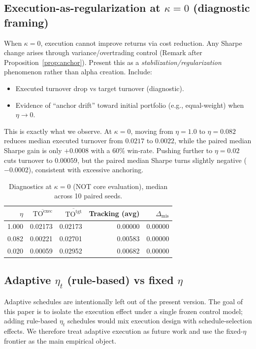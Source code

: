 \documentclass[10pt,twocolumn]{article}
\newcommand{\TOexec}{\mathrm{TO}^{\mathrm{exec}}}
\newcommand{\TOtgt}{\mathrm{TO}^{\mathrm{tgt}}}
\newcommand{\kappaTC}{\kappa}
\begin{document}
\subsection{Execution-as-regularization at $\kappaTC=0$ (diagnostic framing)}
When $\kappaTC=0$, execution cannot improve returns via cost reduction. Any Sharpe change arises through variance/overtrading control (Remark after Proposition~\ref{prop:anchor}). Present this as a \emph{stabilization/regularization} phenomenon rather than alpha creation. Include:
\begin{itemize}[leftmargin=*,itemsep=1pt]
\item Executed turnover drop vs target turnover (diagnostic).
\item Evidence of ``anchor drift'' toward initial portfolio (e.g., equal-weight) when $\eta\to0$.
\end{itemize}
This is exactly what we observe. At $\kappa=0$, moving from $\eta=1.0$ to $\eta=0.082$ reduces median executed turnover from $0.0217$ to $0.0022$, while the paired median Sharpe gain is only $+0.0008$ with a $60\%$ win-rate. Pushing further to $\eta=0.02$ cuts turnover to $0.00059$, but the paired median Sharpe turns slightly negative ($-0.0002$), consistent with excessive anchoring.

\begin{table}[H]
\centering
\caption{Diagnostics at $\kappaTC=0$ (NOT core evaluation), median across 10 paired seeds.}
\label{tab:k0_diag}
\begin{tabular}{@{}rrrrr@{}}
\toprule
$\eta$ & $\overline{\TOexec}$ & $\overline{\TOtgt}$ & Tracking (avg) & $\Delta_{\mathrm{mis}}$\\
\midrule
1.000 & 0.02173 & 0.02173 & 0.00000 & 0.00000 \\
0.082 & 0.00221 & 0.02701 & 0.00583 & 0.00000 \\
0.020 & 0.00059 & 0.02952 & 0.00682 & 0.00000 \\
\bottomrule
\end{tabular}
\end{table}

\subsection{Adaptive $\eta_t$ (rule-based) vs fixed $\eta$}
Adaptive schedules are intentionally left out of the present version. The goal of this paper is to isolate the execution effect under a single frozen control model; adding rule-based $\eta_t$ schedules would mix execution design with schedule-selection effects. We therefore treat adaptive execution as future work and use the fixed-$\eta$ frontier as the main empirical object.
\end{document}
